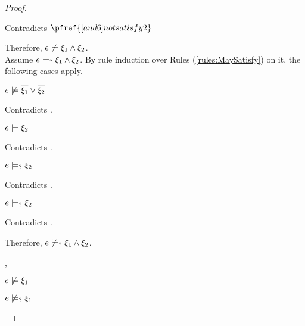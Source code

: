 \begin{proof}
\begin{byCases}
\begin{byCases}
\begin{byCases}
\begin{pfsteps*}
            \end{pfsteps*}
            Contradicts $\pfref{[and6]notsatisfy2}$
        \end{byCases}
        Therefore, $e \not\models \xi_1 \wedge \xi_2$.\\
        Assume $e \models_{?} \xi_1 \wedge \xi_2$. By rule induction over Rules (\ref{rules:MaySatisfy}) on it, the following cases apply.
        \begin{byCases}
        \item[\text{(\ref{rule:CMSNotVal})}]
            \begin{pfsteps*}
            \item $e \not\models \overline{\xi_1} \vee \overline{\xi_2}$ 
            \end{pfsteps*}
            Contradicts .
        \item[\text{(\ref{rule:CMSAnd1})}]
            \begin{pfsteps*}
            \item $e \models \xi_2$ 
            \end{pfsteps*}
            Contradicts .
        \item[\text{(\ref{rule:CMSAnd2})}]
            \begin{pfsteps*}
            \item $e \models_{?} \xi_2$ 
            \end{pfsteps*}
            Contradicts .
        \item[\text{(\ref{rule:CMSAnd3})}]
            \begin{pfsteps*}
            \item $e \models_{?} \xi_2$ 
            \end{pfsteps*}
            Contradicts .
        \end{byCases}
        Therefore, $e \not\models_{?} \xi_1 \wedge \xi_2$.
    \item[\csatisfy{e}{\cdual{\xi_1}},\csatisfy{e}{\xi_2}]
        \begin{pfsteps*}
        \item $e \not\models \xi_1$  
        \item $e \not\models_{?} \xi_1$  

\end{pfsteps*}
\end{byCases}
\end{byCases}
\end{proof}
